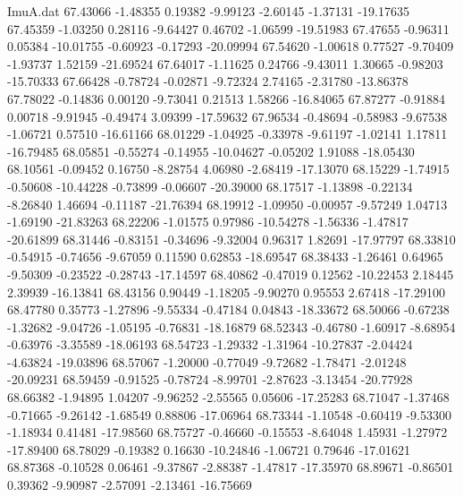 \begin{filecontents}{ImuA.dat}
  67.43066   -1.48355    0.19382   -9.99123   -2.60145   -1.37131  -19.17635
  67.45359   -1.03250    0.28116   -9.64427    0.46702   -1.06599  -19.51983
  67.47655   -0.96311    0.05384  -10.01755   -0.60923   -0.17293  -20.09994
  67.54620   -1.00618    0.77527   -9.70409   -1.93737    1.52159  -21.69524
  67.64017   -1.11625    0.24766   -9.43011    1.30665   -0.98203  -15.70333
  67.66428   -0.78724   -0.02871   -9.72324    2.74165   -2.31780  -13.86378
  67.78022   -0.14836    0.00120   -9.73041    0.21513    1.58266  -16.84065
  67.87277   -0.91884    0.00718   -9.91945   -0.49474    3.09399  -17.59632
  67.96534   -0.48694   -0.58983   -9.67538   -1.06721    0.57510  -16.61166
  68.01229   -1.04925   -0.33978   -9.61197   -1.02141    1.17811  -16.79485
  68.05851   -0.55274   -0.14955  -10.04627   -0.05202    1.91088  -18.05430
  68.10561   -0.09452    0.16750   -8.28754    4.06980   -2.68419  -17.13070
  68.15229   -1.74915   -0.50608  -10.44228   -0.73899   -0.06607  -20.39000
  68.17517   -1.13898   -0.22134   -8.26840    1.46694   -0.11187  -21.76394
  68.19912   -1.09950   -0.00957   -9.57249    1.04713   -1.69190  -21.83263
  68.22206   -1.01575    0.97986  -10.54278   -1.56336   -1.47817  -20.61899
  68.31446   -0.83151   -0.34696   -9.32004    0.96317    1.82691  -17.97797
  68.33810   -0.54915   -0.74656   -9.67059    0.11590    0.62853  -18.69547
  68.38433   -1.26461    0.64965   -9.50309   -0.23522   -0.28743  -17.14597
  68.40862   -0.47019    0.12562  -10.22453    2.18445    2.39939  -16.13841
  68.43156    0.90449   -1.18205   -9.90270    0.95553    2.67418  -17.29100
  68.47780    0.35773   -1.27896   -9.55334   -0.47184    0.04843  -18.33672
  68.50066   -0.67238   -1.32682   -9.04726   -1.05195   -0.76831  -18.16879
  68.52343   -0.46780   -1.60917   -8.68954   -0.63976   -3.35589  -18.06193
  68.54723   -1.29332   -1.31964  -10.27837   -2.04424   -4.63824  -19.03896
  68.57067   -1.20000   -0.77049   -9.72682   -1.78471   -2.01248  -20.09231
  68.59459   -0.91525   -0.78724   -8.99701   -2.87623   -3.13454  -20.77928
  68.66382   -1.94895    1.04207   -9.96252   -2.55565    0.05606  -17.25283
  68.71047   -1.37468   -0.71665   -9.26142   -1.68549    0.88806  -17.06964
  68.73344   -1.10548   -0.60419   -9.53300   -1.18934    0.41481  -17.98560
  68.75727   -0.46660   -0.15553   -8.64048    1.45931   -1.27972  -17.89400
  68.78029   -0.19382    0.16630  -10.24846   -1.06721    0.79646  -17.01621
  68.87368   -0.10528    0.06461   -9.37867   -2.88387   -1.47817  -17.35970
  68.89671   -0.86501    0.39362   -9.90987   -2.57091   -2.13461  -16.75669

\end{filecontents}
